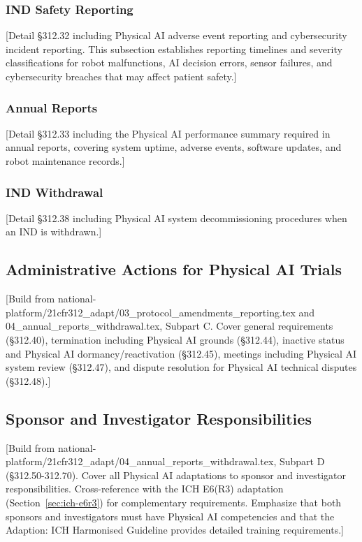 \subsubsection{IND Safety Reporting}
[Detail \S 312.32 including Physical AI adverse event reporting and
cybersecurity incident reporting. This subsection establishes reporting
timelines and severity classifications for robot malfunctions, AI decision
errors, sensor failures, and cybersecurity breaches that may affect patient
safety.]

\subsubsection{Annual Reports}
[Detail \S 312.33 including the Physical AI performance summary required in
annual reports, covering system uptime, adverse events, software updates, and
robot maintenance records.]

\subsubsection{IND Withdrawal}
[Detail \S 312.38 including Physical AI system decommissioning procedures when
an IND is withdrawn.]

\subsection{Administrative Actions for Physical AI Trials}
\label{subsec:cfr312-admin}

[Build from national-platform/21cfr312\_adapt/03\_protocol\_amendments\_reporting.tex
and 04\_annual\_reports\_withdrawal.tex, Subpart C. Cover general requirements
(\S 312.40), termination including Physical AI grounds (\S 312.44), inactive
status and Physical AI dormancy/reactivation (\S 312.45), meetings including
Physical AI system review (\S 312.47), and dispute resolution for Physical AI
technical disputes (\S 312.48).]

\subsection{Sponsor and Investigator Responsibilities}
\label{subsec:cfr312-responsibilities}

[Build from national-platform/21cfr312\_adapt/04\_annual\_reports\_withdrawal.tex,
Subpart D (\S 312.50-312.70). Cover all Physical AI adaptations to sponsor and
investigator responsibilities. Cross-reference with the ICH E6(R3) adaptation
(Section~\ref{sec:ich-e6r3}) for complementary requirements. Emphasize that
both sponsors and investigators must have Physical AI competencies and that
the Adaption: ICH Harmonised Guideline \cite{ich-adapt} provides detailed
training requirements.]

